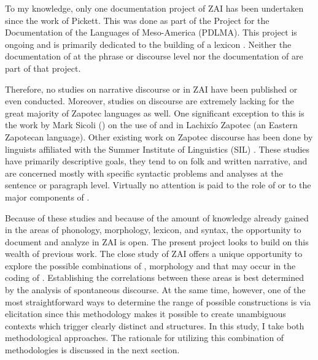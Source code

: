 To my knowledge, only one documentation project of ZAI has been undertaken since the work of Pickett. This was done as part of the Project for the Documentation of the Languages of Meso-America (PDLMA). This project is ongoing and is primarily dedicated to the building of a lexicon \citep{perezms}. Neither the documentation of  at the phrase or discourse level nor the documentation of  are part of that project. 

Therefore, no studies on narrative discourse or  in ZAI have been published or even conducted. Moreover, studies on discourse are extremely lacking for the great majority of Zapotec languages as well. One significant exception to this is the work by Mark Sicoli (\citealt{sicoli2007,sicoli2010}) on the use of  and  in Lachix\'{i}o Zapotec (an Eastern Zapotecan language). Other existing work on Zapotec discourse has been done by linguists affiliated with the Summer Institute of Linguistics (SIL)  \citep{persons1979,long1985,benton1987,benton1997,kreikebaum1987,riggs1987,ward1987,piper1995,heise2003,riggs2010}. These studies have primarily descriptive goals, they tend to  on folk and written narrative, and are concerned mostly with specific syntactic problems and analyses at the sentence or paragraph level. Virtually no attention is paid to the role of  or to the major components of .

Because of these studies and because of the amount of knowledge already gained in the areas of phonology, morphology, lexicon, and syntax, the opportunity to document and analyze  in ZAI is open. The present project looks to build on this wealth of previous work. The close study of ZAI offers a unique opportunity to explore the possible combinations of , morphology and  that may occur in the coding of . Establishing the correlations between these areas is best determined by the analysis of spontaneous discourse. At the same time, however, one of the most straightforward ways to determine the range of possible constructions is via elicitation since this methodology makes it possible to create unambiguous contexts which trigger clearly distinct  and  structures. In this study, I take both methodological approaches. The rationale for utilizing this combination of methodologies is discussed in the next section.


